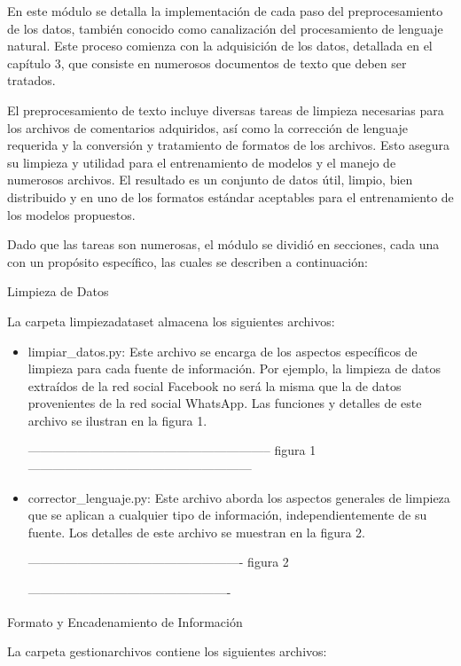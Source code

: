 En este módulo se detalla la implementación de cada paso del preprocesamiento de los datos, también conocido como canalización del procesamiento de lenguaje natural. Este proceso comienza con la adquisición de los datos, detallada en el capítulo 3, que consiste en numerosos documentos de texto que deben ser tratados.


El preprocesamiento de texto incluye diversas tareas de limpieza necesarias para los archivos de comentarios adquiridos, así como la corrección de lenguaje requerida y la conversión y tratamiento de formatos de los archivos. Esto asegura su limpieza y utilidad para el entrenamiento de modelos y el manejo de numerosos archivos. El resultado es un conjunto de datos útil, limpio, bien distribuido y en uno de los formatos estándar aceptables para el entrenamiento de los modelos propuestos.


Dado que las tareas son numerosas, el módulo se dividió en secciones, cada una con un propósito específico, las cuales se describen a continuación:

Limpieza de Datos

La carpeta limpiezadataset almacena los siguientes archivos:


\begin{itemize}

\item limpiar\_datos.py: Este archivo se encarga de los aspectos específicos de limpieza para cada fuente de información. Por ejemplo, la limpieza de datos extraídos de la red social Facebook no será la misma que la de datos provenientes de la red social WhatsApp. Las funciones y detalles de este archivo se ilustran en la figura 1.

-----------------------------------------------------------
figura 1
------------------------------------------------------

\item corrector\_lenguaje.py: Este archivo aborda los aspectos generales de limpieza que se aplican a cualquier tipo de información, independientemente de su fuente. Los detalles de este archivo se muestran en la figura 2.

----------------------------------------------------
figura 2

-------------------------------------------------

\end{itemize}

Formato y Encadenamiento de Información

La carpeta gestionarchivos contiene los siguientes archivos:


